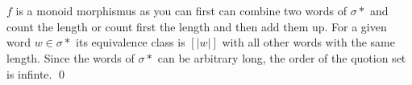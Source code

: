 \documentclass[a4paper,12pt,numbers=noenddot]{scrreport}
\begin{document}
\section{}
$f$ is a monoid morphismus as you can first can combine two words of $\sigma*$ and count the length or count first the length and then add them up.
For a given word $w \in \sigma*$ its equivalence class is $[|w|]$ with all other words with the same length.
Since the words of $\sigma*$ can be arbitrary long, the order of the quotion set is infinte.
\qed
\end{document}
